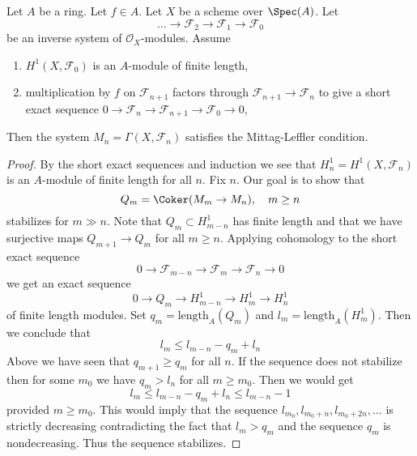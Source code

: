 \begin{lemma}
\label{lemma-ML}
Let $A$ be a ring. Let $f \in A$. Let $X$ be a scheme over $\Spec(A)$. Let
$$
\ldots \to \mathcal{F}_2 \to \mathcal{F}_1 \to \mathcal{F}_0
$$
be an inverse system of $\mathcal{O}_X$-modules. Assume
\begin{enumerate}
\item $H^1(X, \mathcal{F}_0)$ is an $A$-module of finite length,
\item multiplication by $f$ on $\mathcal{F}_{n + 1}$ factors
through $\mathcal{F}_{n + 1} \to \mathcal{F}_n$ to give a
short exact sequence
$0 \to \mathcal{F}_n \to \mathcal{F}_{n + 1} \to \mathcal{F}_0 \to 0$,
\end{enumerate}
Then the system $M_n = \Gamma(X, \mathcal{F}_n)$ satisfies the
Mittag-Leffler condition.
\end{lemma}

\begin{proof}
By the short exact sequences and induction we see that
$H^1_n = H^1(X, \mathcal{F}_n)$ is an $A$-module of finite
length for all $n$. Fix $n$. Our goal is to show that
$$
Q_m = \Coker(M_m \to M_n),\quad m \geq n
$$
stabilizes for $m \gg n$. Note that $Q_m \subset H^1_{m - n}$ has finite length
and that we have surjective maps $Q_{m + 1} \to Q_m$ for all $m \geq n$.
Applying cohomology to the short exact sequence
$$
0 \to \mathcal{F}_{m - n} \to \mathcal{F}_m \to \mathcal{F}_n \to 0
$$
we get an exact sequence
$$
0 \to Q_m \to H^1_{m - n} \to H^1_m \to H^1_n
$$
of finite length modules.
Set $q_m = \text{length}_A(Q_m)$ and $l_m = \text{length}_A(H^1_m)$.
Then we conclude that
$$
l_m \leq l_{m - n} - q_m + l_n
$$
Above we have seen that $q_{m + 1} \geq q_m$ for all $n$. If the sequence
does not stabilize then for some $m_0$ we have $q_m > l_n$ for all
$m \geq m_0$. Then we would get
$$
l_m \leq l_{m - n} - q_m + l_n \leq l_{m - n} - 1
$$
provided $m \geq m_0$. This would imply that the sequence
$l_{m_0}, l_{m_0 + n}, l_{m_0 + 2n}, \ldots$ is strictly decreasing
contradicting the fact that $l_m > q_m$ and the sequence $q_m$
is nondecreasing. Thus the sequence stabilizes.
\end{proof}


